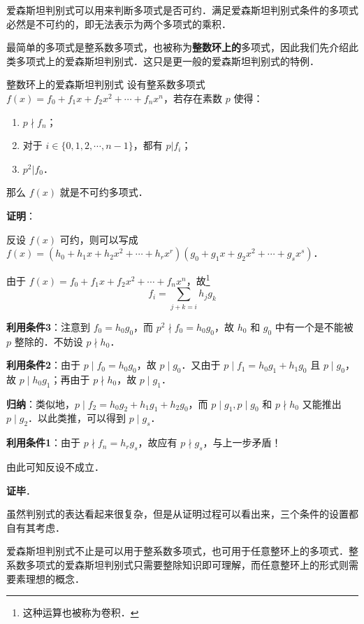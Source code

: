 
爱森斯坦判别式可以用来判断多项式是否可约．满足爱森斯坦判别式条件的多项式必然是不可约的，即无法表示为两个多项式的乘积．

最简单的多项式是整系数多项式，也被称为\textbf{整数环上的}多项式，因此我们先介绍此类多项式上的爱森斯坦判别式．这只是更一般的爱森斯坦判别式的特例．

\begin{theorem}{整数环上的爱森斯坦判别式}\label{EsstCr_the1}
设有整系数多项式 $f(x)=f_0+f_1x+f_2x^2+\cdots+f_nx^n$，若存在素数 $p$ 使得：
\begin{enumerate}
\item $p\nmid f_n$；
\item 对于 $i\in\{0, 1, 2, \cdots, n-1\}$，都有 $p|f_i$；
\item $p^2|f_0$．
\end{enumerate}
那么 $f(x)$ 就是不可约多项式．
\end{theorem}

\textbf{证明}：

反设 $f(x)$ 可约，则可以写成 $f(x)=(h_0+h_1x+h_2x^2+\cdots+h_rx^r)(g_0+g_1x+g_2x^2+\cdots+g_sx^s)$．

由于 $f(x)=f_0+f_1x+f_2x^2+\cdots+f_nx^n$，故\footnote{这种运算也被称为卷积．}\begin{equation}f_i=\sum\limits_{j+k=i}h_jg_k\end{equation}

\textbf{利用条件3}：注意到 $f_0=h_0g_0$，而 $p^2\nmid f_0=h_0g_0$，故 $h_0$ 和 $g_0$ 中有一个是不能被 $p$ 整除的．不妨设 $p\nmid h_0$．

\textbf{利用条件2}：由于 $p\mid f_0=h_0g_0$，故 $p\mid g_0$．又由于 $p\mid f_1=h_0g_1+h_1g_0$ 且 $p\mid g_0$，故 $p\mid h_0g_1$；再由于 $p\nmid h_0$，故 $p\mid g_1$．

\textbf{归纳}：类似地，$p\mid f_2=h_0g_2+h_1g_1+h_2g_0$，而 $p\mid g_1, p\mid g_0$ 和 $p\nmid h_0$ 又能推出 $p\mid g_2$．以此类推，可以得到 $p\mid g_s$．

\textbf{利用条件1}：由于 $p\nmid f_n=h_rg_s$，故应有 $p\nmid g_s$，与上一步矛盾！

由此可知反设不成立．

\textbf{证毕}．

虽然判别式的表达看起来很复杂，但是从证明过程可以看出来，三个条件的设置都自有其考虑．

爱森斯坦判别式不止是可以用于整系数多项式，也可用于任意整环上的多项式．整系数多项式的爱森斯坦判别式只需要整除知识即可理解，而任意整环上的形式则需要素理想的概念．

